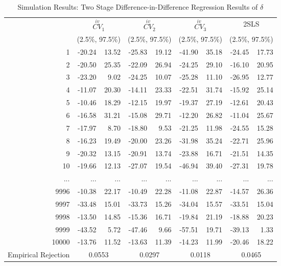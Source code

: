 \begin{table}[ht]
    \caption{Simulation Results: Two Stage Difference-in-Difference Regression Results of $\hat{\delta}$}
    \centering
    \begin{tabular}{rrrrrrrrr}
      \hline
      &\multicolumn{2}{c}{$\overset{iv}{CV}_{1}$} &\multicolumn{2}{c}{$\overset{iv}{CV}_{2}$} &\multicolumn{2}{c}{$\overset{iv}{CV}_{3}$} &\multicolumn{2}{c}{2SLS} \\
      &\multicolumn{2}{c}{(2.5\%, 97.5\%)} &\multicolumn{2}{c}{(2.5\%, 97.5\%)} &\multicolumn{2}{c}{(2.5\%, 97.5\%)} &\multicolumn{2}{c}{(2.5\%, 97.5\%)}\\
      \hline
    1 & -20.24 & 13.52 & -25.83 & 19.12 & -41.90 & 35.18 & -24.45 & 17.73 \\ 
      2 & -20.50 & 25.35 & -22.09 & 26.94 & -24.25 & 29.10 & -16.10 & 20.95 \\ 
      3 & -23.20 & 9.02 & -24.25 & 10.07 & -25.28 & 11.10 & -26.95 & 12.77 \\ 
      4 & -11.07 & 20.30 & -14.11 & 23.33 & -22.51 & 31.74 & -15.92 & 25.14 \\ 
      5 & -10.46 & 18.29 & -12.15 & 19.97 & -19.37 & 27.19 & -12.61 & 20.43 \\ 
      6 & -16.58 & 31.21 & -15.08 & 29.71 & -12.20 & 26.82 & -11.04 & 25.67 \\ 
      7 & -17.97 & 8.70 & -18.80 & 9.53 & -21.25 & 11.98 & -24.55 & 15.28 \\ 
      8 & -16.23 & 19.49 & -20.00 & 23.26 & -31.98 & 35.24 & -22.71 & 25.96 \\ 
      9 & -20.32 & 13.15 & -20.91 & 13.74 & -23.88 & 16.71 & -21.51 & 14.35 \\ 
      10 & -19.66 & 12.13 & -27.07 & 19.54 & -46.94 & 39.40 & -27.31 & 19.78 \\
      ... & ... & ... & ... & ... & ... & ... & ... & ... \\
      9996 & -10.38 & 22.17 & -10.49 & 22.28 & -11.08 & 22.87 & -14.57 & 26.36 \\ 
      9997 & -33.48 & 15.01 & -33.73 & 15.26 & -34.04 & 15.57 & -33.51 & 15.04 \\ 
      9998 & -13.50 & 14.85 & -15.36 & 16.71 & -19.84 & 21.19 & -18.88 & 20.23 \\ 
      9999 & -43.52 & 5.72 & -47.46 & 9.66 & -57.51 & 19.71 & -39.13 & 1.33 \\ 
      10000 & -13.76 & 11.52 & -13.63 & 11.39 & -14.23 & 11.99 & -20.46 & 18.22 \\ 
       \hline
      Empirical Rejection & \multicolumn{2}{c}{0.0553} &\multicolumn{2}{c}{0.0297} &\multicolumn{2}{c}{0.0118} &\multicolumn{2}{c}{0.0465} \\
      \hline
    \end{tabular}
\end{table} 